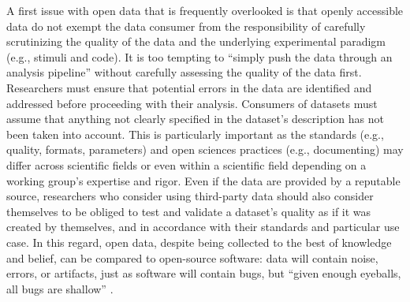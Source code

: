 A first issue with open data that is frequently overlooked is that openly
accessible data do not exempt the data consumer from the responsibility of
carefully scrutinizing the quality of the data and the underlying experimental
paradigm (e.g., stimuli and code).
%
It is too tempting to ``simply push the data through an analysis pipeline''
without carefully assessing the quality of the data first.
%
Researchers must ensure that potential errors in the data are identified and
addressed before proceeding with their analysis.
Consumers of datasets must assume that anything not clearly specified in the
dataset's description has not been taken into account.
This is particularly important as the standards (e.g., quality, formats,
parameters) and open sciences practices (e.g., documenting) may differ across
scientific fields or even within a scientific field depending on a working
group's expertise and rigor.
Even if the data are provided by a reputable source, researchers who consider
using third-party data should also consider themselves to be obliged to test and
validate a dataset's quality as if it was created by themselves, and in
accordance with their standards and particular use case.
%
In this regard, open data, despite being collected to the best of knowledge and
belief, can be compared to open-source software:
data will contain noise, errors, or artifacts, just as software will contain
bugs, but ``given enough eyeballs, all bugs are shallow'' \citep[][p.
30]{raymond1999cathedral}.

